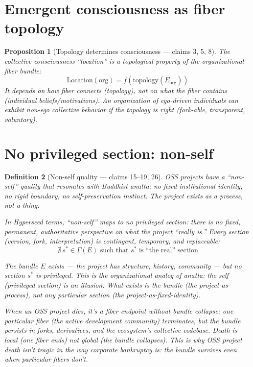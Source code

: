 \documentclass[11pt,a4paper]{article}
\newtheorem{definition}{Definition}[section]
\newtheorem{proposition}[definition]{Proposition}
\begin{document}
\section{Emergent consciousness as fiber topology}

\begin{proposition}[Topology determines consciousness --- claims 3, 5, 8]
\label{prop:topology}
The collective consciousness ``location'' is a topological property of
the organizational fiber bundle:
\[
  \text{Location}(\text{org}) = f(\text{topology}(E_{\text{org}}))
\]
It depends on how fiber connects (topology), not on what the fiber
contains (individual beliefs/motivations). An organization of ego-driven
individuals can exhibit non-ego collective behavior if the topology
is right (fork-able, transparent, voluntary).
\end{proposition}


\section{No privileged section: non-self}
\label{sec:nonself}

\begin{definition}[Non-self quality --- claims 15--19, 26]
\label{def:nonself}
OSS projects have a ``non-self'' quality that resonates with Buddhist
anatta: no fixed institutional identity, no rigid boundary, no
self-preservation instinct. The project exists as a process, not a thing.

In Hyperseed terms, ``non-self'' maps to \emph{no privileged section}:
there is no fixed, permanent, authoritative perspective on what the
project ``really is.'' Every section (version, fork, interpretation)
is contingent, temporary, and replaceable:
\[
  \nexists\, s^* \in \Gamma(E) \text{ such that } s^*
  \text{ is ``the real'' section}
\]

The bundle $E$ exists --- the project has structure, history, community
--- but no section $s^*$ is privileged. This is the organizational analog
of anatta: the self (privileged section) is an illusion. What exists is
the bundle (the project-as-process), not any particular section
(the project-as-fixed-identity).

When an OSS project dies, it's a \emph{fiber endpoint without bundle
collapse}: one particular fiber (the active development community)
terminates, but the bundle persists in forks, derivatives, and the
ecosystem's collective codebase. Death is local (one fiber ends) not
global (the bundle collapses). This is why OSS project death isn't
tragic in the way corporate bankruptcy is: the bundle survives even
when particular fibers don't.
\end{definition}
\end{document}
